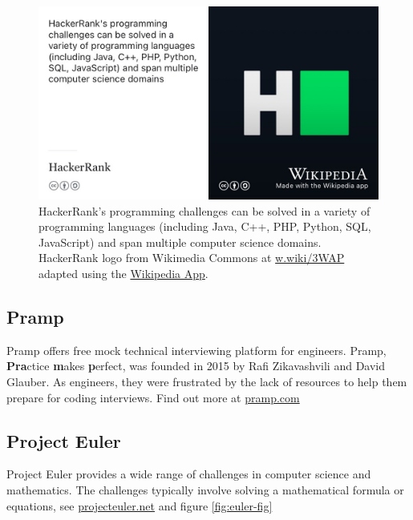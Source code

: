 \documentclass[
]{book}
\begin{document}
\begin{figure}

{\centering \includegraphics[width=0.99\linewidth]{images/hackerrank} 

}

\caption{HackerRank's programming challenges can be solved in a variety of programming languages (including Java, C++, PHP, Python, SQL, JavaScript) and span multiple computer science domains. HackerRank logo from Wikimedia Commons at \href{https://w.wiki/3WAP}{w.wiki/3WAP} adapted using the \href{https://apps.apple.com/us/app/wikipedia/id324715238}{Wikipedia App}.}\label{fig:hackerrank-fig}
\end{figure}



\hypertarget{pramp}{%
\subsection{Pramp}\label{pramp}}

Pramp offers free mock technical interviewing platform for engineers. Pramp, \textbf{Pra}ctice \textbf{m}akes \textbf{p}erfect, was founded in 2015 by Rafi Zikavashvili and David Glauber. As engineers, they were frustrated by the lack of resources to help them prepare for coding interviews. Find out more at \href{https://www.pramp.com}{pramp.com}

\hypertarget{euler}{%
\subsection{Project Euler}\label{euler}}

Project Euler provides a wide range of challenges in computer science and mathematics. The challenges typically involve solving a mathematical formula or equations, see \href{https://projecteuler.net/}{projecteuler.net} and figure \ref{fig:euler-fig}
\end{document}
